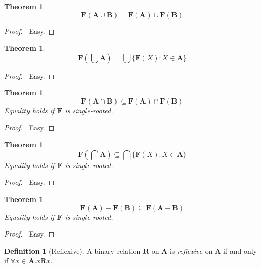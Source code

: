 \documentclass{article}
\let\qed\relax
\newtheorem{theorem}[axiom]{Theorem}
\theoremstyle{definition}
\newtheorem{definition}[axiom]{Definition}
\begin{document}
    \begin{theorem}
        \[ \mathbf{F}(\mathbf{A} \cup \mathbf{B}) = \mathbf{F}(\mathbf{A}) \cup \mathbf{F}(\mathbf{B}) \]
    \end{theorem}

    \begin{proof}
        \pf\ Easy. \qed
    \end{proof}

    \begin{theorem}
        \[ \mathbf{F}(\bigcup \mathbf{A}) = \bigcup \{ \mathbf{F}(X) : X \in \mathbf{A} \} \]
    \end{theorem}

    \begin{proof}
        \pf\ Easy. \qed
    \end{proof}
    
    \begin{theorem}
        \[ \mathbf{F}(\mathbf{A} \cap \mathbf{B}) \subseteq \mathbf{F}(\mathbf{A}) \cap \mathbf{F}(\mathbf{B}) \]
        Equality holds if $\mathbf{F}$ is single-rooted.
    \end{theorem}

    \begin{proof}
        \pf\ Easy. \qed
    \end{proof}

    \begin{theorem}
        \[ \mathbf{F}(\bigcap \mathbf{A}) \subseteq \bigcap \{ \mathbf{F}(X) : X \in \mathbf{A} \} \]
        Equality holds if $\mathbf{F}$ is single-rooted.
    \end{theorem}

    \begin{proof}
        \pf\ Easy. \qed
    \end{proof}

    \begin{theorem}
        \[ \mathbf{F}(\mathbf{A}) - \mathbf{F}(\mathbf{B}) \subseteq \mathbf{F}(\mathbf{A} - \mathbf{B}) \]
        Equality holds if $\mathbf{F}$ is single-rooted.
    \end{theorem}

    \begin{proof}
        \pf\ Easy. \qed
    \end{proof}

    \begin{definition}[Reflexive]
        A binary relation $\mathbf{R}$ on $\mathbf{A}$ is \emph{reflexive} on $\mathbf{A}$ if and only if
        $\forall x \in \mathbf{A}. x\mathbf{R}x$.
    \end{definition}
\end{document}
